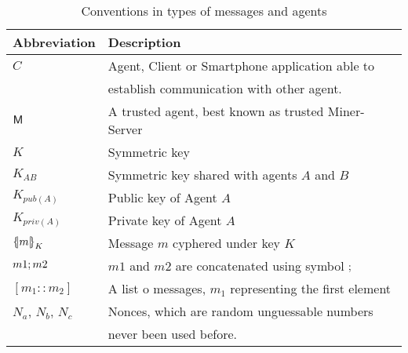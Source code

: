 \begin{table}[htb]
\footnotesize
\begin{center}
\caption{Conventions in types of messages and agents}
\label{table:conventions}
\begin{tabular}{|l|l|}
\hline
{\bf Abbreviation}& {\bf Description}                                   \\\hline\hline
$C$                 &  Agent, Client or Smartphone application able to \\
                    &  establish communication with other agent.         \\ 
$\textsf{M}$           &  A trusted agent, best known as trusted Miner-Server      \\
$K$                 &  Symmetric key                                      \\
$K_{AB}$            &  Symmetric key shared with agents $A$ and $B$       \\
$K_{pub(A)}$        &  Public key of Agent $A$                            \\
$K_{priv(A)}$       &  Private key of Agent $A$                           \\
$\fat{m}_{K}$       &  Message $m$ cyphered under key $K$                 \\
$m1; m2$         &  $m1$ and $m2$ are concatenated using symbol $;$ \\
$[m_1:: m_2]$       &  A list o messages, $m_1$ representing the first element\\
$N_a$, $N_b$, $N_c$ &  Nonces, which are random unguessable numbers      \\
                    &  never been used before.                           \\ \hline \hline
\end{tabular}
\end{center}
\end{table}
\normalsize

